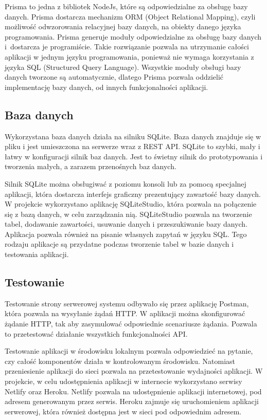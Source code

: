 \documentclass[a4paper,12pt]{book}
\begin{document}
Prisma to jedna z bibliotek NodeJs, które są odpowiedzialne za obsługę bazy danych. Prisma dostarcza mechanizm ORM (Object Relational Mapping), czyli możliwość odwzorowania relacyjnej bazy danych, na obiekty danego języka programowania. Prisma generuje moduły odpowiedzialne za obsługę bazy danych i~dostarcza je programiście. Takie rozwiązanie pozwala na utrzymanie całości aplikacji w jednym języku programowania, ponieważ nie wymaga korzystania z języka SQL (Structured Query Language). Wszystkie moduły obsługi bazy danych tworzone są automatycznie, dlatego Prisma pozwala oddzielić implementację bazy danych, od innych funkcjonalności aplikacji.

\subsection {Baza danych}

Wykorzystana baza danych działa na silniku SQLite. Baza danych znajduje się w pliku i jest umieszczona na serwerze wraz z REST API. SQLite to szybki, mały i łatwy w konfiguracji silnik baz danych. Jest to świetny silnik do prototypowania i tworzenia małych, a zarazem przenośnych baz danych.

Silnik SQLite można obsługiwać z poziomu konsoli lub za pomocą specjalnej aplikacji, która dostarcza interfejs graficzny prezentujący zawartość bazy danych. W projekcie wykorzystano aplikację SQLiteStudio, która pozwala na połączenie się z bazą danych, w celu zarządzania nią. SQLiteStudio pozwala na tworzenie tabel, dodawanie zawartości, usuwanie danych i przeszukiwanie bazy danych. Aplikacja pozwala również na pisanie własnych zapytań w języku SQL. Tego rodzaju aplikacje są przydatne podczas tworzenie tabel w bazie danych i testowania aplikacji.

\subsection{Testowanie}

Testowanie strony serwerowej systemu odbywało się przez aplikację Postman, która pozwala na wysyłanie żądań HTTP. W aplikacji można skonfigurować żądanie HTTP, tak aby zasymulować odpowiednie scenariusze żądania. Pozwala to przetestować działanie wszystkich funkcjonalności API.

Testowanie aplikacji w środowisku lokalnym pozwala odpowiedzieć na pytanie, czy całość komponentów działa w kontrolowanym środowisku. Natomiast przeniesienie aplikacji do sieci pozwala na przetestowanie wydajności aplikacji. W projekcie, w celu udostępnienia aplikacji w internecie wykorzystano serwisy Netlify oraz Heroku. Netlify pozwala na udostępnienie aplikacji internetowej, pod adresem generowanym przez serwis. Heroku zajmuje się uruchomieniem aplikacji serwerowej, która również dostępna jest w sieci pod odpowiednim adresem.
\end{document}
